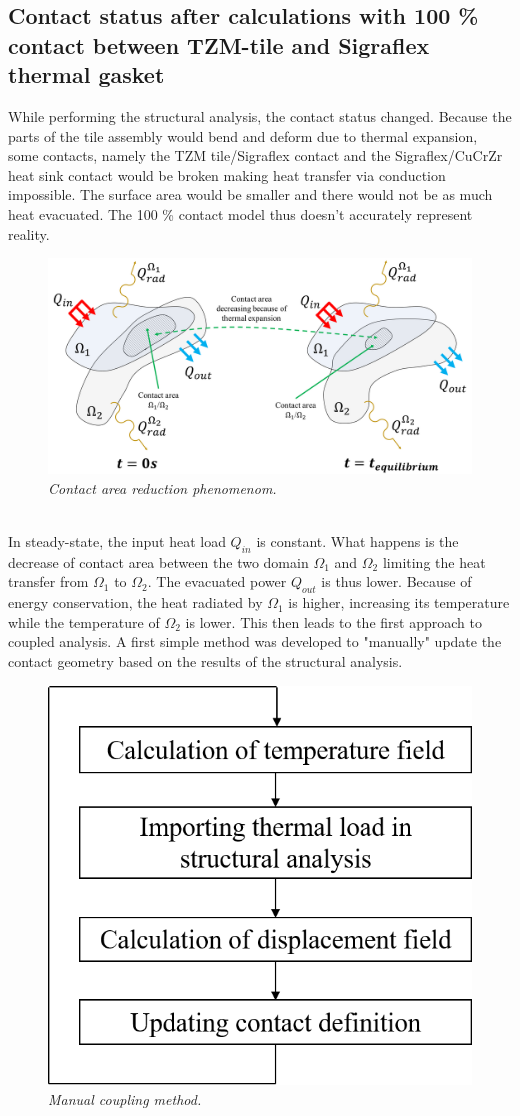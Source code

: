 \subsection{Contact status after calculations with 100 \% contact between TZM-tile and Sigraflex thermal gasket}
\normalsize{While performing the structural analysis, the contact status changed. Because the parts of the tile assembly would bend and deform due to thermal expansion, some contacts, namely the \acrshort{TZM} tile/Sigraflex contact and the Sigraflex/\acrshort{CuCrZr} heat sink contact would be broken making heat transfer via conduction impossible. The surface area would be smaller and there would not be as much heat evacuated. The 100 \% contact model thus doesn't accurately represent reality.}
\\
\begin{figure}[!ht]
    \label{fig_5_17} 
    \centering
    \includegraphics[width=1\textwidth]{figures/contactchangeschema.png}
    \caption{\it Contact area reduction phenomenom.}
\end{figure}
\\
\normalsize{\indent In steady-state, the input heat load $Q_{in}$ is constant. What happens is the decrease of contact area between the two domain $\Omega_1$ and $\Omega_2$ limiting the heat transfer from $\Omega_1$ to $\Omega_2$. The evacuated power $Q_{out}$ is thus lower. Because of energy conservation, the heat radiated by $\Omega_1$ is higher, increasing its temperature while the temperature of $\Omega_2$ is lower. This then leads to the first approach to coupled analysis. A first simple method was developed to "manually" update the contact geometry based on the results of the structural analysis.}
\\
\begin{figure}[!ht]
    \label{fig_5_19} 
    \centering
    \includegraphics[width=.4\textwidth]{figures/manualCouplingMethod.png}
    \caption{\it Manual coupling method.}
\end{figure}

